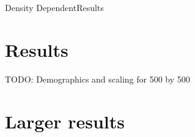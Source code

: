\documentclass{beamer}
\newcommand{\todo}[1]{}
\renewcommand{\todo}[1]{{\color{red} TODO: {#1}}}
\begin{document}
\begin{frame}{Density Dependent}{Results}
    \begin{center}
    \end{center}
\end{frame}

\section{Results}

\begin{frame}
    \todo{Demographics and scaling for 500 by 500}
\end{frame}

\section{Larger results}
\end{document}
